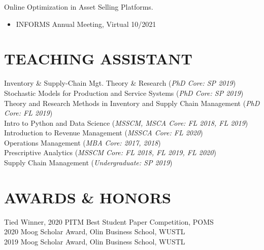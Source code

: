 \documentclass[margin, 10pt]{res} %
\begin{document}
\begin{resume}
Online Optimization in Asset Selling Platforms.
\begin{itemize}
    \item INFORMS Annual Meeting, Virtual \hfill 10/2021
\end{itemize}

\section{TEACHING ASSISTANT}
Inventory \& Supply-Chain Mgt. Theory \& Research ({\it PhD Core: SP 2019})\\
Stochastic Models for Production and Service Systems ({\it PhD Core: SP 2019})\\
Theory and Research Methods in Inventory and Supply Chain Management ({\it PhD Core: FL 2019})\\
Intro to Python and Data Science ({\it MSSCM, MSCA Core: FL 2018, FL 2019})\\		
Introduction to Revenue Management ({\it MSSCA Core: FL 2020})\\
Operations Management ({\it MBA Core: 2017, 2018})\\
Prescriptive Analytics ({\it MSSCM Core: FL 2018, FL 2019, FL 2020})\\		
Supply Chain Management ({\it Undergraduate: SP 2019})\\


\section{AWARDS \& HONORS} 
Tied Winner, 2020 PITM Best Student Paper Competition, POMS\\
2020 Moog Scholar Award, Olin Business School, WUSTL\\
2019 Moog Scholar Award, Olin Business School, WUSTL\\


\end{resume}
\end{document}

